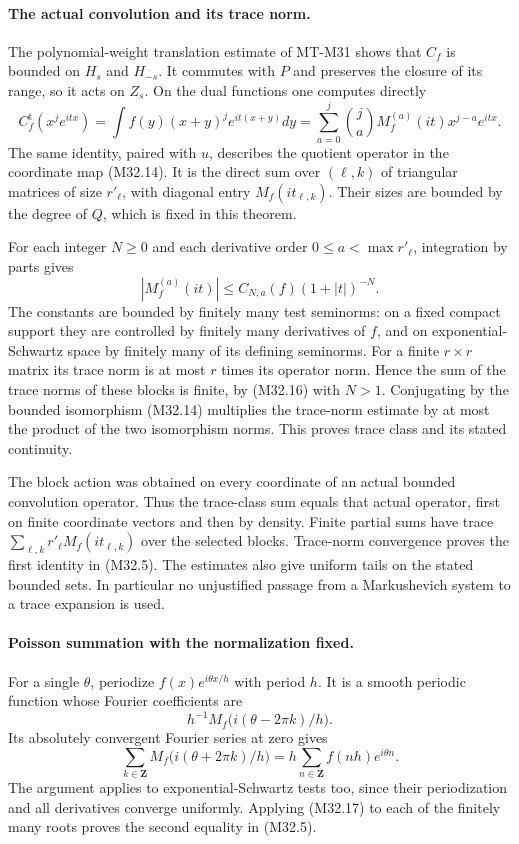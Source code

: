 \paragraph{The actual convolution and its trace norm.}
The polynomial-weight translation estimate of MT-M31
shows that $C_f$ is bounded on $H_s$ and $H_{-s}$.
It commutes with $P$ and preserves the closure of its range,
so it acts on $Z_s$.  On the dual functions one computes
directly
\[
 C_f^{\mathrm t}(x^je^{itx})
  =\int f(y)(x+y)^je^{it(x+y)}dy
  =\sum_{a=0}^{j}\binom ja M_f^{(a)}(it)
                                  x^{j-a}e^{itx}.
 \tag{M32.15}
\]
The same identity, paired with $u$, describes the quotient
operator in the coordinate map (M32.14).  It is the
direct sum over $(\ell,k)$ of triangular matrices of
size $r'_\ell$, with diagonal entry $M_f(it_{\ell,k})$.
Their sizes are bounded by the degree of $Q$, which is
fixed in this theorem.

For each integer $N\geq0$ and each derivative order
$0\leq a<\max r'_\ell$, integration by parts gives
\[
 |M_f^{(a)}(it)|\leq C_{N,a}(f)(1+|t|)^{-N}.
 \tag{M32.16}
\]
The constants are bounded by finitely many test seminorms:
on a fixed compact support they are controlled by finitely
many derivatives of $f$, and on exponential-Schwartz
space by finitely many of its defining seminorms.
For a finite $r\times r$ matrix its trace norm is at most
$r$ times its operator norm.  Hence the sum of the trace
norms of these blocks is finite, by (M32.16) with $N>1$.
Conjugating by the bounded isomorphism (M32.14) multiplies
the trace-norm estimate by at most the product of the two
isomorphism norms.  This proves trace class and its stated
continuity.

The block action was obtained on every coordinate of an
actual bounded convolution operator.  Thus the trace-class
sum equals that actual operator, first on finite coordinate
vectors and then by density.  Finite partial sums have
trace $\sum_{\ell,k}r'_\ell M_f(it_{\ell,k})$ over the
selected blocks.  Trace-norm convergence proves the first
identity in (M32.5).  The estimates also give uniform
tails on the stated bounded sets.  In particular no
unjustified passage from a Markushevich system to a
trace expansion is used.

\paragraph{Poisson summation with the normalization fixed.}
For a single $\theta$, periodize
$f(x)e^{i\theta x/h}$ with period $h$.
It is a smooth periodic function whose Fourier coefficients
are
\[
        h^{-1}M_f\bigl(i(\theta-2\pi k)/h\bigr).
\]
Its absolutely convergent Fourier series at zero gives
\[
 \sum_{k\in\mathbf Z}M_f\bigl(i(\theta+2\pi k)/h\bigr)
       =h\sum_{n\in\mathbf Z}f(nh)e^{i\theta n}.
 \tag{M32.17}
\]
The argument applies to exponential-Schwartz tests too,
since their periodization and all derivatives converge
uniformly.  Applying (M32.17) to each of the finitely
many roots proves the second equality in (M32.5).

